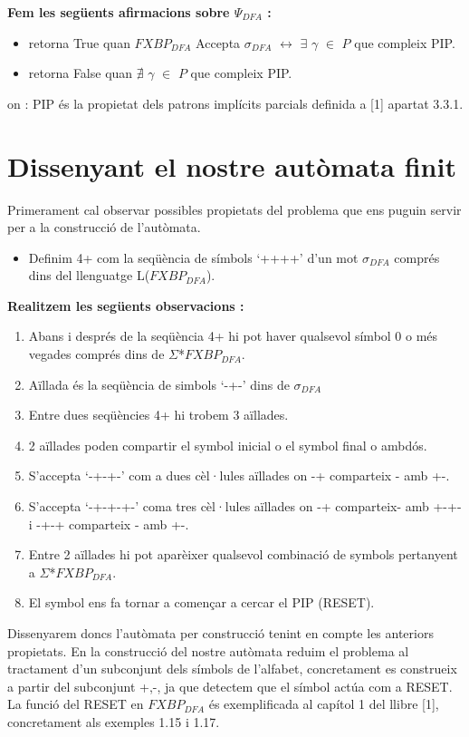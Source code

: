 \documentclass[12pt,a4paper]{report}
\def \dfa{$FXBP_{DFA} $}
\def \alphabetDFA{$\Sigma$*\dfa}
\def \wdfa{$\sigma_{DFA} $}
\def \postDFA{$\Psi_{DFA}$}
\def \llesca{$\gamma$}
\begin{document}
\textbf{Fem les següents afirmacions sobre \postDFA{} :}
\begin{itemize}
\item retorna True quan \dfa{} Accepta \wdfa{} $\leftrightarrow$ $\exists$ \llesca{} $\in$ $P$ que compleix PIP.
\item retorna False quan $\nexists$ \llesca{} $\in$ $P$ que compleix PIP.
\end{itemize}
on : PIP és la propietat dels patrons implícits parcials definida a [1] apartat 3.3.1.

\section{Dissenyant el nostre autòmata finit}

Primerament cal observar possibles propietats del problema que ens puguin servir per a la construcció de l’autòmata.

\begin{itemize}
\item Definim 4+ com la seqüència de símbols ‘++++’ d’un mot \wdfa{} comprés dins del llenguatge L(\dfa{}).
\end{itemize}

\textbf{Realitzem les següents observacions :}

\begin{enumerate}
\item Abans i després de la seqüència 4+ hi pot haver qualsevol símbol 0 o més vegades comprés dins de \alphabetDFA{}.
\item Aïllada és la seqüència de simbols ‘-+-’ dins de \wdfa{}
\item Entre dues seqüències 4+ hi trobem 3 aïllades.
\item 2 aïllades poden compartir el symbol inicial o el symbol final o ambdós.
\item S’accepta ‘-+-+-’ com a dues cèl·lules aïllades on -+ comparteix - amb +-.
\item S’accepta ‘-+-+-+-’ coma  tres cèl·lules aïllades on -+ comparteix- amb +-+- i -+-+ comparteix - amb +-.
\item Entre 2 aïllades hi pot aparèixer qualsevol combinació de symbols pertanyent a \alphabetDFA{}.
\item El symbol \Return ens fa tornar a començar a cercar el PIP (RESET).
\end{enumerate}


Dissenyarem doncs l’autòmata per construcció tenint en compte les anteriors propietats. En la construcció del nostre autòmata reduim el problema al tractament d’un subconjunt dels símbols de l’alfabet, concretament es construeix a partir del subconjunt {+,-}, ja que detectem que el símbol \Return actúa com a RESET. La funció del RESET en \dfa{} és exemplificada al capítol 1 del llibre [1], concretament als exemples 1.15 i 1.17.
\end{document}
